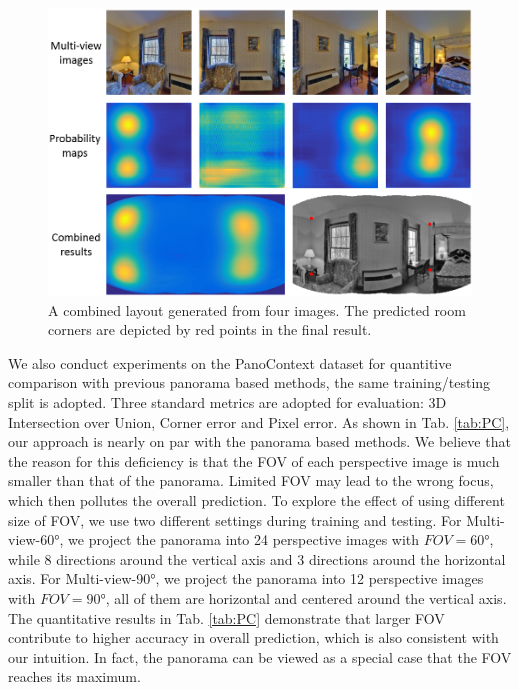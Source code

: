 \begin{figure}
	\centering
	\includegraphics[width=\linewidth]{figs/partial2.png}
	\caption{A combined layout generated from four images. The predicted room corners are depicted by red points in the final result.}
	\label{fig:partial2}
\end{figure}


We also conduct experiments on the PanoContext dataset for quantitive comparison with previous panorama based methods, the same training/testing split is adopted. 
%
Three standard metrics are adopted for evaluation: 3D Intersection over Union, Corner error and Pixel error. As shown in Tab. \ref{tab:PC}, our approach is nearly on par with the panorama based methods. 
%
We believe that the reason for this deficiency is that the FOV of each perspective image is much smaller than that of the panorama. Limited FOV may lead to the wrong focus, which then pollutes the overall prediction. 
%
To explore the effect of using different size of FOV, we use two different settings during training and testing. For Multi-view-\ang{60}, we project the panorama into 24 perspective images with $FOV=\ang{60}$, while 8 directions around the vertical axis and 3 directions around the horizontal axis. For Multi-view-\ang{90}, we project the panorama into 12 perspective images with $FOV=\ang{90}$, all of them are horizontal and centered around the vertical axis. 
%
The quantitative results in Tab. \ref{tab:PC} demonstrate that larger FOV contribute to higher accuracy in overall prediction, which is also consistent with our intuition. In fact, the panorama can be viewed as a special case that the FOV reaches its maximum.




